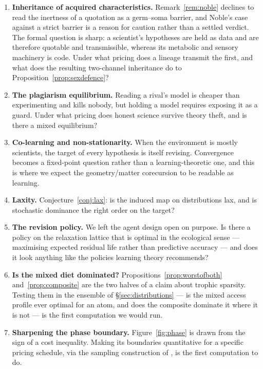 \documentclass[11pt]{article}
\theoremstyle{plain}
\theoremstyle{definition}
\begin{document}
\begin{enumerate}
\item \label{op:noble} \textbf{Inheritance of acquired characteristics.} Remark~\ref{rem:noble}
declines to read the inertness of a quotation as a germ--soma barrier, and Noble's case against a
strict barrier \cite{Noble} is a reason for caution rather than a settled verdict. The formal question
is sharp: a scientist's hypotheses are held as data and are therefore quotable and transmissible,
whereas its metabolic and sensory machinery is code. Under what pricing does a lineage transmit the
first, and what does the resulting two-channel inheritance do to
Proposition~\ref{prop:sexdefence}?

\item \textbf{The plagiarism equilibrium.} Reading a rival's model is cheaper than experimenting and
kills nobody, but holding a model requires exposing it as a guard. Under what pricing does honest
science survive theory theft, and is there a mixed equilibrium?

\item \textbf{Co-learning and non-stationarity.} When the environment is mostly scientists, the target
of every hypothesis is itself revising. Convergence becomes a fixed-point question rather than a
learning-theoretic one, and this is where we expect the geometry/matter corecursion to be readable as
learning.

\item \textbf{Laxity.} Conjecture~\ref{conj:lax}: is the induced map on distributions lax, and is
stochastic dominance the right order on the target?

\item \textbf{The revision policy.} We left the agent design open on purpose. Is there a policy on the
relaxation lattice that is optimal in the ecological sense --- maximising expected residual life
rather than predictive accuracy --- and does it look anything like the policies learning theory
recommends?

\item \textbf{Is the mixed diet dominated?} Propositions~\ref{prop:worstofboth}
and~\ref{prop:composite} are the two halves of a claim about trophic sparsity. Testing them in the
ensemble of \S\ref{sec:distributions} --- is the mixed access profile ever optimal for an atom, and
does the composite dominate it where it is not --- is the first computation we would run.

\item \textbf{Sharpening the phase boundary.} Figure~\ref{fig:phase} is drawn from the sign of a cost
inequality. Making its boundaries quantitative for a specific pricing schedule, via the sampling
construction of \cite{StochSim}, is the first computation to do.
\end{enumerate}
\end{document}
